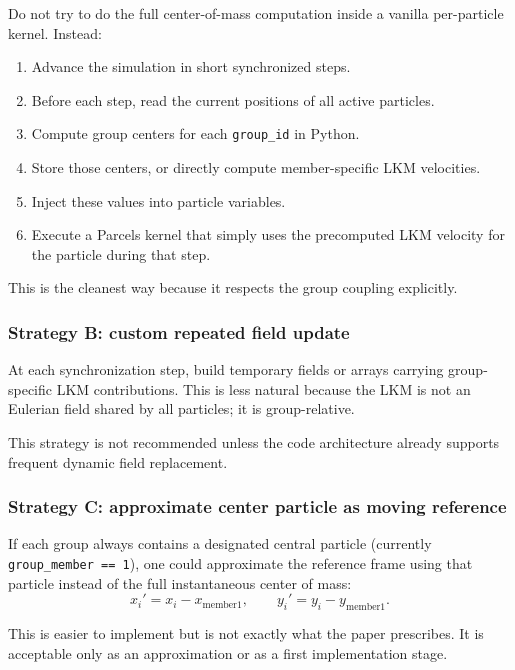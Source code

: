 \documentclass[11pt,a4paper]{article}
\begin{document}
	Do not try to do the full center-of-mass computation inside a vanilla per-particle kernel. Instead:
	\begin{enumerate}[label=\arabic*.]
		\item Advance the simulation in short synchronized steps.
		\item Before each step, read the current positions of all active particles.
		\item Compute group centers for each \texttt{group\_id} in Python.
		\item Store those centers, or directly compute member-specific LKM velocities.
		\item Inject these values into particle variables.
		\item Execute a Parcels kernel that simply uses the precomputed LKM velocity for the particle during that step.
	\end{enumerate}
	
	This is the cleanest way because it respects the group coupling explicitly.
	
	\subsubsection*{Strategy B: custom repeated field update}
	
	At each synchronization step, build temporary fields or arrays carrying group-specific LKM contributions. This is less natural because the LKM is not an Eulerian field shared by all particles; it is group-relative.
	
	This strategy is not recommended unless the code architecture already supports frequent dynamic field replacement.
	
	\subsubsection*{Strategy C: approximate center particle as moving reference}
	
	If each group always contains a designated central particle (currently \texttt{group\_member == 1}), one could approximate the reference frame using that particle instead of the full instantaneous center of mass:
	\begin{equation}
		x_i' = x_i - x_{\mathrm{member1}}, \qquad y_i' = y_i - y_{\mathrm{member1}}.
	\end{equation}
	
	This is easier to implement but is not exactly what the paper prescribes. It is acceptable only as an approximation or as a first implementation stage.
	
\end{document}
